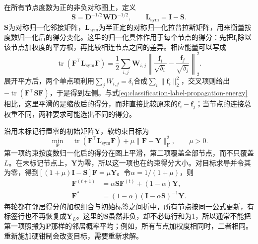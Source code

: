 在所有节点度数为正的非负对称图上，定义
\begin{equation}
  \label{eq:classification-label-spreading-matrices}
  \bm{S}=\bm{D}^{-1/2}\bm{W}\bm{D}^{-1/2},
  \qquad
  \bm{L}_{\mathrm{sym}}=\bm{I}-\bm{S}.
\end{equation}
$\bm{S}$为对称归一化邻接矩阵，$\bm{L}_{\mathrm{sym}}$为半正定的对称归一化拉普拉斯矩阵，用来衡量按度数归一化后的得分变化。这里的归一化具体作用于每个节点的得分：先把$\bm f_i$除以该节点加权度的平方根，再比较相连节点之间的差异。相应能量可以写成
\begin{equation}
  \label{eq:classification-label-spreading-energy}
  \operatorname{tr}(\bm F^\top\bm L_{\mathrm{sym}}\bm F)
    =\frac12\sum_{i,j}\bm W_{i,j}
       \left\lVert\frac{\bm f_i}{\sqrt{\delta_i}}
                    -\frac{\bm f_j}{\sqrt{\delta_j}}\right\rVert_2^2.
\end{equation}
展开平方后，两个单点项利用$\sum_jW_{i,j}=\delta_i$合成$\sum_i\lVert\bm f_i\rVert_2^2$，交叉项则给出$-\operatorname{tr}(\bm F^\top\bm S\bm F)$，于是得到左侧。与式\eqref{eq:classification-label-propagation-energy}相比，这里平滑的是缩放后的得分，而非直接比较原来的$\bm f_i-\bm f_j$；当节点的连接总权重不同，两种要求可能选出不同的得分。

沿用未标记行置零的初始矩阵$\bm{Y}$，软约束目标为
\begin{equation}
  \label{eq:classification-label-spreading-objective}
  \min_{\bm{F}}\quad
    \operatorname{tr}
      (\bm{F}^{\top}\bm{L}_{\mathrm{sym}}\bm{F})
    +\mu\lVert\bm{F}-\bm{Y}\rVert_{\mathrm{F}}^2,
  \qquad \mu>0.
\end{equation}
第一项约束按度数归一化后的得分在图上平滑，第二项覆盖全部节点，而不只覆盖$L$。在未标记节点上，$\bm{Y}$为零，所以这一项也在约束得分大小。对目标求导并令其为零，得到$[(1+\mu)\bm{I}-\bm{S}]\bm{F}=\mu\bm{Y}$。令$\alpha=1/(1+\mu)$，则
\begin{equation}
  \label{eq:classification-label-spreading-fixed-point}
  \begin{aligned}
    \bm{F}^{(t+1)}
      &=\alpha\bm{S}\bm{F}^{(t)}+(1-\alpha)\bm{Y},\\
    \bm{F}^\ast
      &=(1-\alpha)(\bm{I}-\alpha\bm{S})^{-1}\bm{Y}.
  \end{aligned}
\end{equation}
每轮都在邻居得分的加权组合与初始标签之间折中，所有节点按同一公式更新，有标签行也不再恢复成$\bm{Y}_L$。这里的$\bm S$虽然非负，却不必每行和为1，所以通常不能把第一项照搬为$\bm P$那样的邻居概率平均；例如，所有节点加权度相同时，二者相同。重新施加硬钳制会改变目标，需要重新求解。

